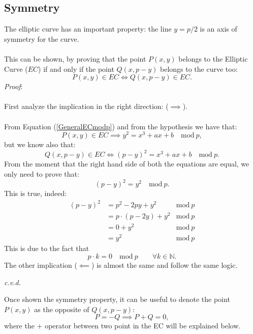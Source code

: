 \subsection{Symmetry}
The elliptic curve has an important property: the line $y=p/2$ is an axis of symmetry for the curve.
\\ \\
This can be shown, by proving that the point $P(x,y)$ belongs to the Elliptic Curve ($EC$) if and only if the point $Q(x,p-y)$ belongs to the curve too:
\begin{equation*}
P(x,y) \in EC \iff Q(x,p-y) \in EC.
\end{equation*}
\textit{Proof}:
\\ \\
First analyze the implication in the right direction: ($\implies $).
\\ \\
From Equation (\ref{GeneralECmodp}) and from the hypothesis we have that:
\begin{equation*}
P(x,y) \in EC \implies y^2=x^3+ax+b \quad \textrm{mod} \ p,
\end{equation*}
but we know also that: 
\begin{equation*}
Q(x,p-y) \in EC \iff (p-y)^2=x^3+ax+b \quad \textrm{mod} \ p.
\end{equation*}
From the moment that the right hand side of both the equations are equal, we only need to prove that:
\begin{equation*}
(p-y)^2=y^2 \quad \textrm{mod} \ p.
\end{equation*}
This is true, indeed:
\begin{align*}
(p-y)^2 & = p^2 -2py + y^2 &  \textrm{mod} \ p \\
& = p\cdot(p -2y) + y^2 &  \textrm{mod} \ p \\
& = 0+y^2 &  \textrm{mod} \ p \\
& = y^2 &  \textrm{mod} \ p
\end{align*}
This is due to the fact that 
\begin{equation*}
p\cdot k =0 \quad \textrm{mod} \ p \qquad \forall k\in \mathbb{N}.
\end{equation*}
The other implication ($\impliedby$) is almost the same and follow the same logic.
\begin{flushright}
	\textit{c.v.d.}
\end{flushright}
Once shown the symmetry property, it can be useful to denote the point $P(x,y)$ as the opposite of $Q(x,p-y)$:
\begin{equation*}
P=-Q \implies P+Q=0,
\end{equation*}
where the $+$ operator between two point in the EC will be explained below.

